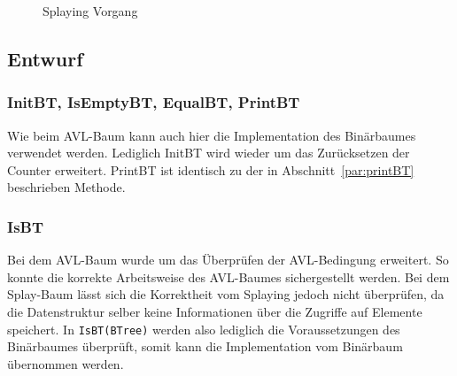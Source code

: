 \begin{figure}[hbt]
    \centering
    \qquad
    \qquad
    \caption{Splaying Vorgang}\label{fig:splayinCase}
\end{figure}

\subsection{Entwurf}\label{subsec:splay-entwurf}

\subsubsection{InitBT, IsEmptyBT, EqualBT, PrintBT}
Wie beim AVL-Baum kann auch hier die Implementation des Binärbaumes verwendet werden.
Lediglich InitBT wird wieder um das Zurücksetzen der Counter erweitert.
PrintBT ist identisch zu der in Abschnitt~\ref{par:printBT} beschrieben Methode.

\subsubsection{IsBT}
Bei dem AVL-Baum wurde  um das Überprüfen der AVL-Bedingung erweitert.
So konnte die korrekte Arbeitsweise des AVL-Baumes sichergestellt werden.
Bei dem Splay-Baum lässt sich die Korrektheit vom Splaying jedoch nicht überprüfen, da die
Datenstruktur selber keine Informationen über die Zugriffe auf Elemente speichert.
In \verb|IsBT(BTree)| werden also lediglich die Voraussetzungen des Binärbaumes überprüft,
somit kann die Implementation vom Binärbaum übernommen werden.

